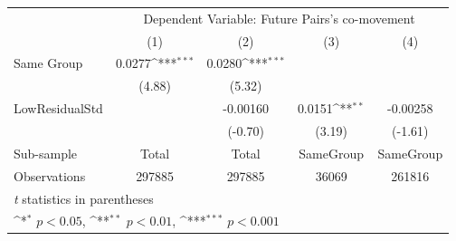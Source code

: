 {
\def\sym#1{\ifmmode^{#1}\else\(^{#1}\)\fi}
\begin{tabular}{l*{4}{c}}
\hline\hline
                &\multicolumn{4}{c}{Dependent Variable:  Future Pairs's co-movement}        \\\cmidrule(lr){2-5}
                &\multicolumn{1}{c}{(1)}         &\multicolumn{1}{c}{(2)}         &\multicolumn{1}{c}{(3)}         &\multicolumn{1}{c}{(4)}         \\
\hline
Same Group      &   0.0277\sym{***}&   0.0280\sym{***}&                  &                  \\
                &   (4.88)         &   (5.32)         &                  &                  \\
[1em]
LowResidualStd  &                  & -0.00160         &   0.0151\sym{**} & -0.00258         \\
                &                  &  (-0.70)         &   (3.19)         &  (-1.61)         \\
\hline
Sub-sample      &    Total         &    Total         &SameGroup         &SameGroup         \\
Observations    &   297885         &   297885         &    36069         &   261816         \\
\hline\hline
\multicolumn{5}{l}{\footnotesize \textit{t} statistics in parentheses}\\
\multicolumn{5}{l}{\footnotesize \sym{*} \(p<0.05\), \sym{**} \(p<0.01\), \sym{***} \(p<0.001\)}\\
\end{tabular}
}
